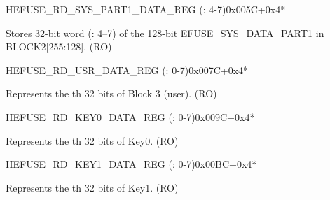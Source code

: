 \begin{register}{H}{EFUSE\_RD\_SYS\_PART1\_DATA\_REG (: 4-7)}{0x005C+0x4*}\label{regdesc:EFUSERDSYSPART1DATA4TO7REG}
%
\regnewline%
\begin{regdesc}\begin{reglist}
\label{fielddesc:EFUSESYSDATAPART1N}\item [EFUSE\_SYS\_DATA\_PART1\_\regindex{n}] Stores 32-bit word  (: 4–7) of the 128-bit EFUSE\_SYS\_DATA\_PART1 in BLOCK2[255:128]. (RO)
\end{reglist}\end{regdesc}
\end{register}


    \begin{register}{H}{EFUSE\_RD\_USR\_DATA\_REG (: 0-7)}{0x007C+0x4*}\label{regdesc:EFUSERDUSRDATANREG}
    \regnewline%
    \begin{regdesc}\begin{reglist}
    \label{fielddesc:EFUSEUSRDATAN}\item [EFUSE\_USR\_DATA\regindex{n}] Represents the th 32 bits of Block 3 (user). (RO)
    \end{reglist}\end{regdesc}
    \end{register}


    \begin{register}{H}{EFUSE\_RD\_KEY0\_DATA\_REG (: 0-7)}{0x009C+0x4*}\label{regdesc:EFUSERDKEY0DATANREG}
    \regnewline%
    \begin{regdesc}\begin{reglist}
    \label{fielddesc:EFUSEKEY0DATAN}\item [EFUSE\_KEY0\_DATA\regindex{n}] Represents the th 32 bits of Key0. (RO)
    \end{reglist}\end{regdesc}
    \end{register}


    \begin{register}{H}{EFUSE\_RD\_KEY1\_DATA\_REG (: 0-7)}{0x00BC+0x4*}\label{regdesc:EFUSERDKEY1DATANREG}
    \regnewline%
    \begin{regdesc}\begin{reglist}
    \label{fielddesc:EFUSEKEY1DATAN}\item [EFUSE\_KEY1\_DATA\regindex{n}] Represents the th 32 bits of Key1. (RO)
    \end{reglist}\end{regdesc}
    \end{register}


